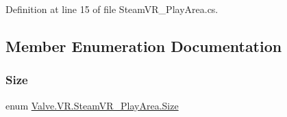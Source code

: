 Definition at line 15 of file Steam\+V\+R\+\_\+\+Play\+Area.\+cs.



\subsection{Member Enumeration Documentation}
\mbox{\label{class_valve_1_1_v_r_1_1_steam_v_r___play_area_a4c0fc5be21f78998e4a1fbef713d2f24}} 
\subsubsection{\texorpdfstring{Size}{Size}}
{\footnotesize\ttfamily enum \mbox{\hyperlink{class_valve_1_1_v_r_1_1_steam_v_r___play_area_a4c0fc5be21f78998e4a1fbef713d2f24}{Valve.\+V\+R.\+Steam\+V\+R\+\_\+\+Play\+Area.\+Size}}\hspace{0.3cm}{\ttfamily [strong]}}


